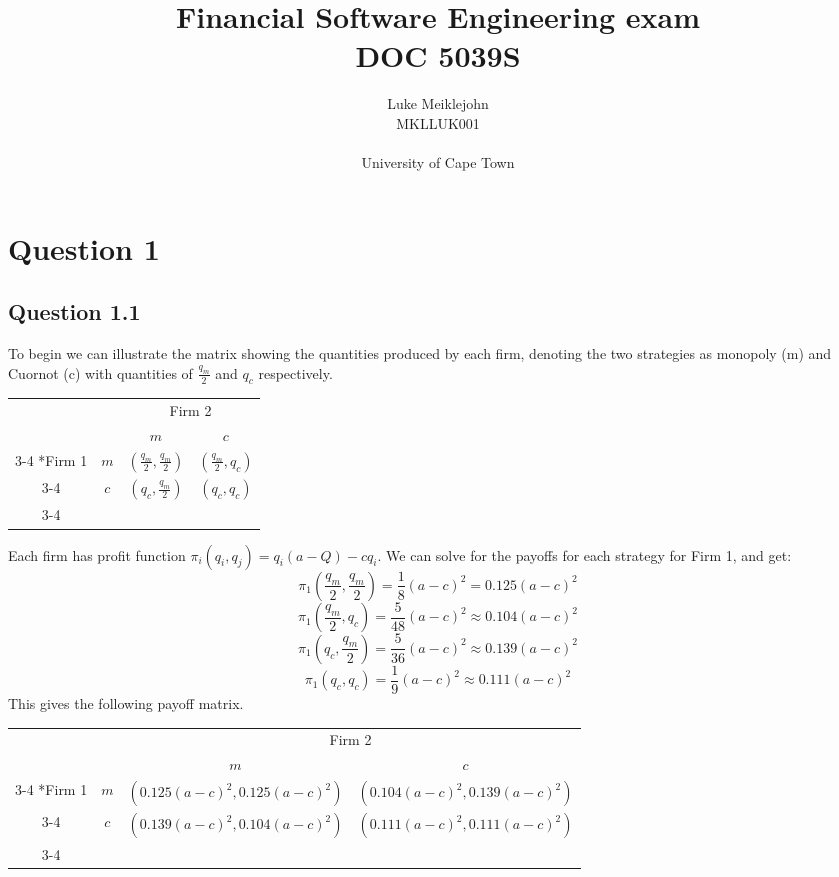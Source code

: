 \documentclass[11pt,a4paper]{article}
\title{Financial Software Engineering exam \\ DOC 5039S}
\author{Luke Meiklejohn
\\MKLLUK001
\\
\\University of Cape Town}
\begin{document}
\maketitle
\pagebreak
\section*{Question 1}
\subsection*{Question 1.1}

To begin we can illustrate the matrix showing the quantities produced by each firm, denoting the two strategies as monopoly (m) and Cuornot (c) with quantities of $\frac{q_m}{2}$ and $q_c$ respectively.
\begin{table}[h]
    \setlength{\extrarowheight}{2pt}
    \begin{center}
    \begin{tabular}{cc|c|c|}
      & \multicolumn{1}{c}{} & \multicolumn{2}{c}{Firm 2}\\
      & \multicolumn{1}{c}{} & \multicolumn{1}{c}{$m$}  & \multicolumn{1}{c}{$c$} \\\cline{3-4}
      \multirow{2}*{Firm 1}  & $m$ & $(\frac{q_m}{2},\frac{q_m}{2})$ & $(\frac{q_m}{2},q_c)$ \\\cline{3-4}
      & $c$ & $(q_c,\frac{q_m}{2})$ & $(q_c,q_c)$ \\\cline{3-4}
	\end{tabular}
	\end{center}
\end{table} 

Each firm has profit function $\pi_i(q_i, q_j) = q_i(a-Q)-cq_i$.
We can solve for the payoffs for each strategy for Firm 1, and get:
$$\pi_1(\frac{q_m}{2}, \frac{q_m}{2}) = \frac{1}{8}(a-c)^2  = 0.125(a-c)^2$$
$$\pi_1(\frac{q_m}{2}, q_c) = \frac{5}{48}(a-c)^2 \approx 0.104(a-c)^2 $$
$$\pi_1(q_c, \frac{q_m}{2}) = \frac{5}{36}(a-c)^2 \approx 0.139(a-c)^2 $$
$$\pi_1(q_c, q_c) = \frac{1}{9}(a-c)^2 \approx 0.111(a-c)^2 $$
This gives the following payoff matrix.
\begin{table}[h]
    \setlength{\extrarowheight}{2pt}
    \begin{center}
    \begin{tabular}{cc|c|c|}
      & \multicolumn{1}{c}{} & \multicolumn{2}{c}{Firm 2}\\
      & \multicolumn{1}{c}{} & \multicolumn{1}{c}{$m$}  & \multicolumn{1}{c}{$c$} \\\cline{3-4}
      \multirow{2}*{Firm 1}  & $m$ & $(0.125(a-c)^2,0.125(a-c)^2)$ & $(0.104(a-c)^2,0.139(a-c)^2)$ \\\cline{3-4}
      & $c$ & $(0.139(a-c)^2,0.104(a-c)^2)$ & $(0.111(a-c)^2,0.111(a-c)^2)$ \\\cline{3-4}
	\end{tabular}
	\end{center}
\end{table}
\end{document}
